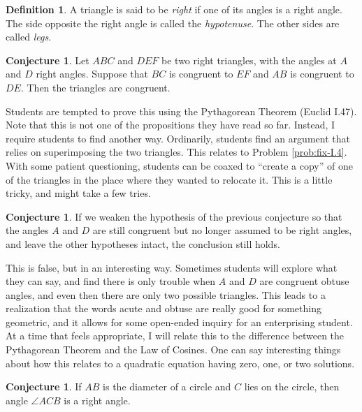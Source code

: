 \documentclass{tufte-handout}
\theoremstyle{definition}
\newtheorem{conjecture}[problem]{Conjecture}
\newtheorem*{definition}{Definition}
\begin{document}
\begin{definition}
\label{defn:right-triangles}
A triangle is said to be \emph{right} if one of its angles is a right angle. 
The side opposite the right angle is called the \emph{hypotenuse}. 
The other sides are called \emph{legs}.
\end{definition}

\begin{conjecture}
\label{conj:RASS}
Let $ABC$ and $DEF$ be two right triangles, with the angles at $A$ and $D$ right angles. 
Suppose that $BC$ is congruent to $EF$ and $AB$ is congruent to $DE$. 
Then the triangles are congruent.
\end{conjecture}

Students are tempted to prove this using the Pythagorean Theorem (Euclid I.47). Note that this is not one of the propositions they have read so far. Instead, I require students to find another way. Ordinarily, students find an argument that relies on superimposing the two triangles. This relates to Problem \ref{prob:fix-I.4}. With some patient questioning, students can be coaxed to ``create a copy'' of one of the triangles in the place where they wanted to relocate it. This is a little tricky, and might take a few tries. 

\begin{conjecture}
\label{conj:ASS}
If we weaken the hypothesis of the previous conjecture so that the angles $A$ and $D$ are still congruent but no longer assumed to be right angles, and leave the other hypotheses intact, the conclusion still holds.
\end{conjecture}

This is false, but in an interesting way. Sometimes students will explore what they can say, and find there is only trouble when $A$ and $D$ are congruent obtuse angles, and even then there are only two possible triangles. This leads to a realization that the words acute and obtuse are really good for something geometric, and it allows for some open-ended inquiry for an enterprising student. At a time that feels appropriate, I will relate this to the difference between the Pythagorean Theorem and the Law of Cosines. One can say interesting things about how this relates to a quadratic equation having zero, one, or two solutions.


\begin{conjecture}
\label{conj:thales1}
If $AB$ is the diameter of a circle and $C$ lies on the circle, then angle $\angle ACB$ is a right angle.
\end{conjecture}
\end{document}
